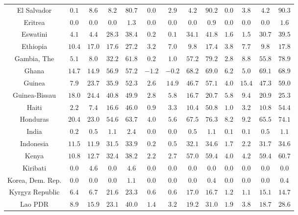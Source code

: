 \begin{longtable}{ccccccccccccc}
El Salvador & $0.1$ & $8.6$ & $8.2$ & $80.7$ & $0.0$ & $2.9$ & $4.2$ & $90.2$ & $0.0$ & $3.8$ & $4.2$ & $90.3$ \\ 
Eritrea & $0.0$ & $0.0$ & $0.0$ & $1.3$ & $0.0$ & $0.0$ & $0.0$ & $0.9$ & $0.0$ & $0.0$ & $0.0$ & $1.6$ \\ 
Eswatini & $4.1$ & $4.4$ & $28.3$ & $38.4$ & $0.2$ & $0.1$ & $34.1$ & $41.8$ & $1.6$ & $1.5$ & $30.7$ & $39.5$ \\ 
Ethiopia & $10.4$ & $17.0$ & $17.6$ & $27.2$ & $3.2$ & $7.0$ & $9.8$ & $17.4$ & $3.8$ & $7.7$ & $9.8$ & $17.8$ \\ 
Gambia, The & $5.1$ & $8.0$ & $32.2$ & $61.8$ & $0.2$ & $1.0$ & $57.2$ & $79.2$ & $2.8$ & $8.8$ & $55.8$ & $78.9$ \\ 
Ghana & $14.7$ & $14.9$ & $56.9$ & $57.2$ & $-1.2$ & $-0.2$ & $68.2$ & $69.0$ & $6.2$ & $5.0$ & $69.1$ & $68.9$ \\ 
Guinea & $7.9$ & $23.7$ & $35.9$ & $52.3$ & $2.6$ & $14.9$ & $46.7$ & $57.1$ & $4.0$ & $15.4$ & $47.3$ & $59.0$ \\ 
Guinea-Bissau & $18.0$ & $24.4$ & $40.8$ & $49.9$ & $2.8$ & $5.8$ & $16.7$ & $20.7$ & $5.8$ & $9.4$ & $20.9$ & $25.3$ \\ 
Haiti & $2.2$ & $7.4$ & $16.6$ & $46.0$ & $0.9$ & $3.3$ & $10.4$ & $50.8$ & $1.0$ & $3.2$ & $10.8$ & $54.4$ \\ 
Honduras & $20.4$ & $23.0$ & $54.6$ & $63.7$ & $4.0$ & $5.6$ & $67.5$ & $76.3$ & $8.2$ & $9.2$ & $65.5$ & $74.1$ \\ 
India & $0.2$ & $0.5$ & $1.1$ & $2.4$ & $0.0$ & $0.0$ & $0.5$ & $1.1$ & $0.1$ & $0.1$ & $0.5$ & $1.1$ \\ 
Indonesia & $11.5$ & $11.9$ & $31.5$ & $33.9$ & $0.2$ & $0.5$ & $32.1$ & $34.6$ & $1.7$ & $2.2$ & $31.7$ & $34.6$ \\ 
Kenya & $10.8$ & $12.7$ & $32.4$ & $38.2$ & $2.2$ & $2.7$ & $57.0$ & $59.4$ & $4.0$ & $4.2$ & $59.4$ & $60.7$ \\ 
Kiribati & $0.0$ & $4.6$ & $0.0$ & $4.6$ & $0.0$ & $0.0$ & $0.0$ & $0.0$ & $0.0$ & $0.0$ & $0.0$ & $0.0$ \\ 
Korea, Dem. Rep. & $0.0$ & $0.0$ & $0.0$ & $1.1$ & $0.0$ & $0.0$ & $0.0$ & $0.4$ & $0.0$ & $0.0$ & $0.0$ & $0.4$ \\ 
Kyrgyz Republic & $6.4$ & $6.7$ & $21.6$ & $23.3$ & $0.6$ & $0.6$ & $17.0$ & $16.7$ & $1.2$ & $1.1$ & $15.1$ & $14.7$ \\ 
Lao PDR & $8.9$ & $15.9$ & $23.1$ & $40.0$ & $1.4$ & $3.2$ & $19.2$ & $31.0$ & $1.9$ & $3.8$ & $18.7$ & $28.6$ \\ 

\end{longtable}
